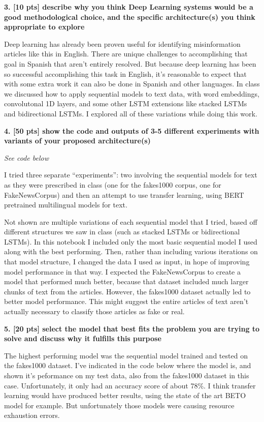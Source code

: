 \documentclass[11pt]{article}
\begin{document}
    \textbf{3. {[}10 pts{]} describe why you think Deep Learning systems
would be a good methodological choice, and the specific architecture(s)
you think appropriate to explore}

    Deep learning has already been proven useful for identifying
misinformation articles like this in English. There are unique
challenges to accomplishing that goal in Spanish that aren't entirely
resolved. But because deep learning has been so successful accomplishing
this task in English, it's reasonable to expect that with some extra
work it can also be done in Spanish and other languages. In class we
discussed how to apply sequential models to text data, with word
embeddings, convolutonal 1D layers, and some other LSTM extensions like
stacked LSTMs and bidirectional LSTMs. I explored all of these
variations while doing this work.

    \textbf{4. {[}50 pts{]} show the code and outputs of 3-5 different
experiments with variants of your proposed architecture(s)}

\emph{See code below}

    I tried three separate ``experiments'': two involving the sequential
models for text as they were prescribed in class (one for the fakes1000
corpus, one for FakeNewsCorpus) and then an attempt to use transfer
learning, using BERT pretrained multilingual models for text.

Not shown are multiple variations of each sequential model that I tried,
based off different structures we saw in class (such as stacked LSTMs or
bidirectional LSTMs). In this notebook I included only the most basic
sequential model I used along with the best performing. Then, rather
than including various iterations on that model structure, I changed the
data I used as input, in hope of improving model performance in that
way. I expected the FakeNewsCorpus to create a model that performed much
better, because that dataset included much larger chunks of text from
the articles. However, the fakes1000 dataset actually led to better
model performance. This might suggest the entire articles of text aren't
actually necessary to classify those articles as fake or real.

    \textbf{5. {[}20 pts{]} select the model that best fits the problem you
are trying to solve and discuss why it fulfills this purpose}

    The highest performing model was the sequential model trained and tested
on the fakes1000 dataset. I've indicated in the code below where the
model is, and shown it's peformance on my test data, also from the
fakes1000 dataset in this case. Unfortunately, it only had an accuracy
score of about 78\%. I think transfer learning would have produced
better results, using the state of the art BETO model for example. But
unfortunately those models were causing resource exhaustion errors.
\end{document}
